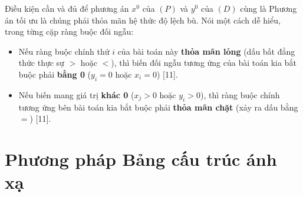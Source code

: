 \begin{theorem}
Điều kiện cần và đủ để phương án $x^0$ của $(P)$ và $y^0$ của $(D)$ cùng là Phương án tối ưu là chúng phải thỏa mãn hệ thức độ lệch bù. Nói một cách dễ hiểu, trong từng cặp ràng buộc đối ngẫu:
\begin{itemize}
    \item Nếu ràng buộc chính thứ $i$ của bài toán này \textbf{thỏa mãn lỏng} (dấu bất đẳng thức thực sự $>$ hoặc $<$), thì biến đối ngẫu tương ứng của bài toán kia bắt buộc phải \textbf{bằng 0} ($y_i = 0$ hoặc $x_i = 0$) [11].
    \item Nếu biến mang giá trị \textbf{khác 0} ($x_j > 0$ hoặc $y_i > 0$), thì ràng buộc chính tương ứng bên bài toán kia bắt buộc phải \textbf{thỏa mãn chặt} (xảy ra dấu bằng $=$) [11].
\end{itemize}
\end{theorem}

\section{Phương pháp Bảng cấu trúc ánh xạ}
    